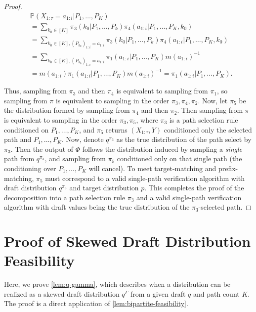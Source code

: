\documentclass{article}
\theoremstyle{plain}
\theoremstyle{definition}
\theoremstyle{remark}
\begin{document}
\begin{proof}
    \begin{align}
        &\mathbb{P}(X_{1:\tau}=a_{1:i}|P_1,\ldots,P_K) \\
        &= \sum_{k_0 \in [K]}  \pi_3(k_0|P_1,\ldots,P_k) \pi_4(a_{1:i}|P_1,\ldots,P_K,k_0) \\
        &= \sum_{k_0 \in [K], (P_{k_0})_{1:i}=a_{1:i}}  \pi_3(k_0|P_1,\ldots,P_k) \pi_4(a_{1:i}|P_1,\ldots,P_K,k_0) \\
        &=\sum_{k_0 \in [K],(P_{k_0})_{1:i}=a_{1:i}} \pi_1(a_{1:i}|P_1,\ldots,P_K)m(a_{1:i})^{-1}\\
        &=m(a_{1:i})\pi_1(a_{1:i}|P_1,\ldots,P_K)m(a_{1:i})^{-1}=\pi_1(a_{1:i}|P_1,\ldots,P_K).
    \end{align}

    Thus, sampling from $\pi_3$ and then $\pi_4$ is equivalent to sampling from $\pi_1$, so sampling from $\pi$ is equivalent to sampling in the order $\pi_3,\pi_4,\pi_2$. Now, let $\pi_5$ be the distribution formed by sampling from $\pi_4$ and then $\pi_2$. Then sampling from $\pi$ is equivalent to sampling in the order $\pi_3,\pi_5$, where $\pi_3$ is a path selection rule conditioned on $P_1,\ldots,P_K$, and $\pi_5$ returns $(X_{1:\tau},Y)$ conditioned only the selected path and $P_1,\ldots,P_K$. Now, denote $q^{\pi_3}$ as the true distribution of the path select by $\pi_3$. Then the output of $\Phi$ follows the distribution induced by sampling a \textit{single} path from $q^{\pi_3}$, and sampling from $\pi_5$ conditioned only on that single path (the conditioning over $P_1,\ldots,P_K$ will cancel). To meet target-matching and prefix-matching, $\pi_5$ must correspond to a valid single-path verification algorithm with draft distribution $q^{\pi_3}$ and target distribution $p$. This completes the proof of the decomposition into a path selection rule $\pi_3$ and a valid single-path verification algorithm with draft values being the true distribution of the $\pi_3$-selected path.
\end{proof}








\section{Proof of Skewed Draft Distribution Feasibility}
\label{appendix:q-gamma}

Here, we prove \cref{lem:q-gamma}, which describes when a distribution can be realized as a skewed draft distribution $q^\Gamma$ from a given draft $q$ and path count $K$. The proof is a direct application of \cref{lem:bipartite-feasibility}. 
\end{document}
